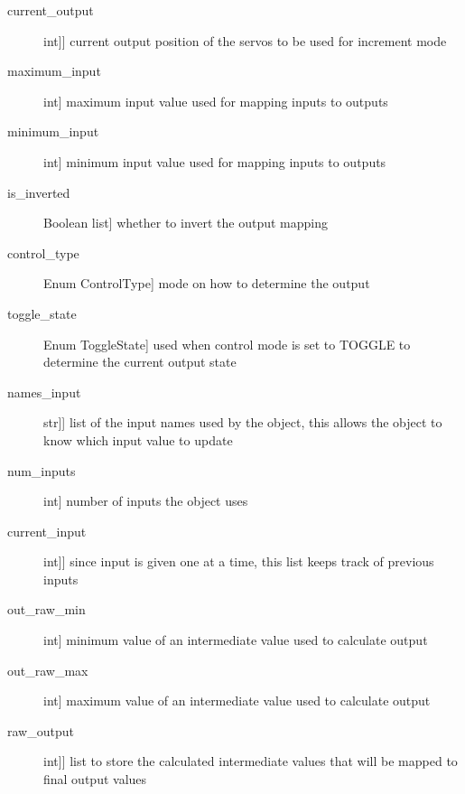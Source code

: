 \documentclass[letterpaper,10pt,english]{sphinxmanual}
\begin{document}
\begin{fulllineitems}
\begin{description}
\item[{current\_output}] \leavevmode{[}{[}int{]}{]}
\sphinxAtStartPar
current output position of the servos to be used for increment mode

\item[{maximum\_input}] \leavevmode{[}int{]}
\sphinxAtStartPar
maximum input value used for mapping inputs to outputs

\item[{minimum\_input}] \leavevmode{[}int{]}
\sphinxAtStartPar
minimum input value used for mapping inputs to outputs

\item[{is\_inverted}] \leavevmode{[}Boolean list{]}
\sphinxAtStartPar
whether to invert the output mapping

\item[{control\_type}] \leavevmode{[}Enum ControlType{]}
\sphinxAtStartPar
mode on how to determine the output

\item[{toggle\_state}] \leavevmode{[}Enum ToggleState{]}
\sphinxAtStartPar
used when control mode is set to TOGGLE to determine the current output state

\item[{names\_input}] \leavevmode{[}{[}str{]}{]}
\sphinxAtStartPar
list of the input names used by the object, this allows the object to know which input value to update

\item[{num\_inputs}] \leavevmode{[}int{]}
\sphinxAtStartPar
number of inputs the object uses

\item[{current\_input}] \leavevmode{[}{[}int{]}{]}
\sphinxAtStartPar
since input is given one at a time, this list keeps track of previous inputs

\item[{out\_raw\_min}] \leavevmode{[}int{]}
\sphinxAtStartPar
minimum value of an intermediate value used to calculate output

\item[{out\_raw\_max}] \leavevmode{[}int{]}
\sphinxAtStartPar
maximum value of an intermediate value used to calculate output

\item[{raw\_output}] \leavevmode{[}{[}int{]}{]}
\sphinxAtStartPar
list to store the calculated intermediate values that will be mapped to final output values

\end{description}


\end{fulllineitems}
\end{document}
